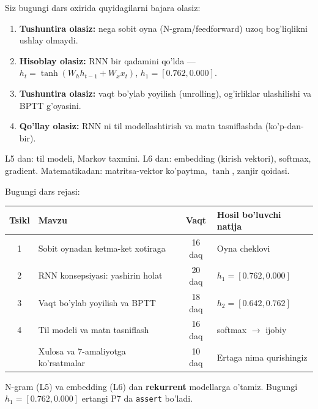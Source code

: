 \documentclass[aspectratio=169,11pt]{beamer}
\begin{document}
\begin{frame}{Siz bugungi dars oxirida quyidagilarni bajara olasiz:}
  \begin{enumerate}\setlength\itemsep{6pt}
    \item \textbf{Tushuntira olasiz:} nega sobit oyna (N-gram/feedforward) uzoq
          bog'liqlikni ushlay olmaydi.
    \item \textbf{Hisoblay olasiz:} RNN bir qadamini qo'lda ---
          $h_t=\tanh(W_h h_{t-1}+W_x x_t)$, $h_1=[0.762,0.000]$.
    \item \textbf{Tushuntira olasiz:} vaqt bo'ylab yoyilish (unrolling), og'irliklar
          ulashilishi va BPTT g'oyasini.
    \item \textbf{Qo'llay olasiz:} RNN ni til modellashtirish va matn tasniflashda
          (ko'p-dan-bir).
  \end{enumerate}
  \vspace{4pt}
  \begin{tcolorbox}[defbox,title=Oldindan talab]
    \footnotesize
    L5 dan: til modeli, Markov taxmini. L6 dan: embedding (kirish vektori), softmax,
    gradient. Matematikadan: matritsa-vektor ko'paytma, $\tanh$, zanjir qoidasi.
  \end{tcolorbox}
\end{frame}

\begin{frame}{Bugungi dars rejasi:}
  \begin{center}
  \small
  \begin{tabular}{c p{5.2cm} c p{3.0cm}}
    \toprule
    \textbf{Tsikl}& \textbf{Mavzu} & \textbf{Vaqt} & \textbf{Hosil bo'luvchi natija}\\
    \midrule
    1 & Sobit oynadan ketma-ket xotiraga & 16 daq & Oyna cheklovi \\
    2 & RNN konsepsiyasi: yashirin holat & 20 daq & $h_1=[0.762,0.000]$ \\
    3 & Vaqt bo'ylab yoyilish va BPTT & 18 daq & $h_2=[0.642,0.762]$ \\
    4 & Til modeli va matn tasniflash & 16 daq & softmax $\to$ ijobiy \\
    \midrule
      & Xulosa va 7-amaliyotga ko'rsatmalar & 10 daq & Ertaga nima qurishingiz \\
    \bottomrule
  \end{tabular}
  \end{center}
  \vspace{4pt}
  \begin{tcolorbox}[warnbox,title=Bu dars neyron ketma-ketlik modellarini ochadi]
    \footnotesize\sloppy
    N-gram (L5) va embedding (L6) dan \textbf{rekurrent} modellarga o'tamiz.
    Bugungi $h_1=[0.762,0.000]$ ertangi P7 da \texttt{assert} bo'ladi.
  \end{tcolorbox}
\end{frame}
\end{document}
